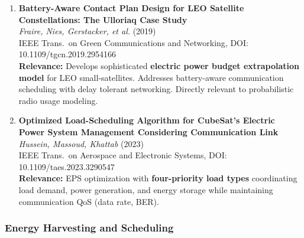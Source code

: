 \documentclass[11pt]{article}
\begin{document}
\begin{enumerate}[label=\textbf{\arabic*.},resume]
    \item \textbf{Battery-Aware Contact Plan Design for LEO Satellite Constellations: The Ulloriaq Case Study}\\
    \textit{Fraire, Nies, Gerstacker, et al.} (2019)\\
    IEEE Trans.\ on Green Communications and Networking, DOI: 10.1109/tgcn.2019.2954166\\
    \textbf{Relevance:} Develops sophisticated \textbf{electric power budget extrapolation model} for LEO small-satellites. Addresses battery-aware communication scheduling with delay tolerant networking. Directly relevant to probabilistic radio usage modeling.

    \item \textbf{Optimized Load-Scheduling Algorithm for CubeSat's Electric Power System Management Considering Communication Link}\\
    \textit{Hussein, Massoud, Khattab} (2023)\\
    IEEE Trans.\ on Aerospace and Electronic Systems, DOI: 10.1109/taes.2023.3290547\\
    \textbf{Relevance:} EPS optimization with \textbf{four-priority load types} coordinating load demand, power generation, and energy storage while maintaining communication QoS (data rate, BER).
\end{enumerate}

\subsubsection{Energy Harvesting and Scheduling}
\end{document}
